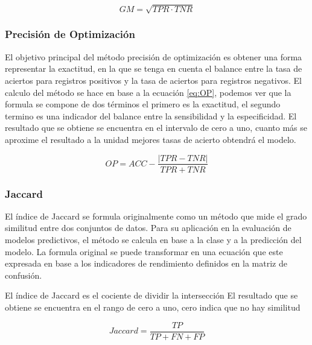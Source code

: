 \bigbreak

\begin{equation}
    GM = \sqrt{TPR \cdot TNR}
    \label{eq:GM}
\end{equation}


\subsubsection{Precisión de Optimización}

El objetivo principal del método precisión de optimización es obtener una forma representar la exactitud, en la que se tenga en cuenta el balance entre la tasa de aciertos para registros positivos y la tasa de aciertos para registros negativos. El calculo del método se hace en base a la ecuación \ref{eq:OP}, podemos ver que la formula se compone de dos términos el primero es la exactitud, el segundo termino es una indicador del balance entre la sensibilidad y la especificidad. El resultado que se obtiene se encuentra en el intervalo de cero a uno, cuanto más se aproxime el resultado a la unidad mejores tasas de acierto obtendrá el modelo.

\bigbreak

\begin{equation}
    OP = ACC - \frac{|TPR-TNR|}{TPR+TNR}
    \label{eq:OP}
\end{equation}


\subsubsection{Jaccard}

El índice de  Jaccard se formula originalmente como un método que mide el grado similitud entre dos conjuntos de datos. Para su aplicación en la evaluación de modelos predictivos, el método se calcula en base a la clase y a la predicción del modelo. La formula original se puede transformar en una ecuación que este expresada en base a los indicadores de rendimiento definidos en la matriz de confusión.


El índice de Jaccard es el cociente de dividir la intersección El resultado que se obtiene se encuentra en el rango de cero a uno, cero indica que no hay similitud 

\bigbreak

\begin{equation}
    Jaccard = \frac{TP}{TP+FN+FP}
    \label{eq:Jaccard}
\end{equation}

